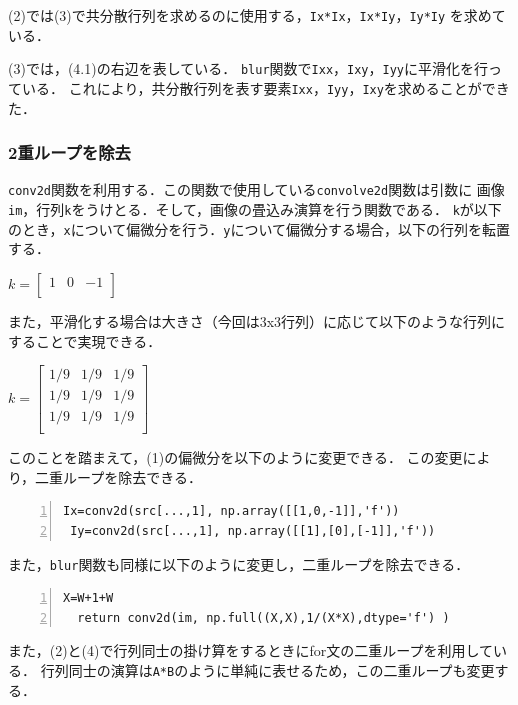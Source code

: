 \documentclass[autodetect-engine,dvi=dvipdfmx,ja=standard,
               a4j,11pt]{bxjsarticle}
\begin{document}
(2)では(3)で共分散行列を求めるのに使用する，\verb|Ix*Ix|，\verb|Ix*Iy|，\verb|Iy*Iy|
を求めている．

(3)では，(4.1)の右辺を表している．
\verb|blur|関数で\verb|Ixx|，\verb|Ixy|，\verb|Iyy|に平滑化を行っている．
これにより，共分散行列を表す要素\verb|Ixx|，\verb|Iyy|，\verb|Ixy|を求めることができた．

\subsubsection{2重ループを除去}

\verb|conv2d|関数を利用する．この関数で使用している\verb|convolve2d|関数は引数に
画像\verb|im|，行列\verb|k|をうけとる．そして，画像の畳込み演算を行う関数である．
\verb|k|が以下のとき，\verb|x|について偏微分を行う．\verb|y|について偏微分する場合，以下の行列を転置する．

$k=\begin{bmatrix}
1 & 0 & -1 \\
\end{bmatrix}$

また，平滑化する場合は大きさ（今回は3x3行列）に応じて以下のような行列にすることで実現できる．

$k=\begin{bmatrix}
1/9 & 1/9 & 1/9 \\
1/9 & 1/9 & 1/9 \\
1/9 & 1/9 & 1/9 \\
\end{bmatrix}$

このことを踏まえて，(1)の偏微分を以下のように変更できる．
この変更により，二重ループを除去できる．

\begin{Verbatim}[numbers=left, xleftmargin=10mm, numbersep=6pt,
                    fontsize=\small, baselinestretch=0.8]
 Ix=conv2d(src[...,1], np.array([[1,0,-1]],'f'))
 Iy=conv2d(src[...,1], np.array([[1],[0],[-1]],'f'))
\end{Verbatim}

また，\verb|blur|関数も同様に以下のように変更し，二重ループを除去できる．

\begin{Verbatim}[numbers=left, xleftmargin=10mm, numbersep=6pt,
                    fontsize=\small, baselinestretch=0.8]
 X=W+1+W
  return conv2d(im, np.full((X,X),1/(X*X),dtype='f') )
\end{Verbatim}

また，(2)と(4)で行列同士の掛け算をするときにfor文の二重ループを利用している．
行列同士の演算は\verb|A*B|のように単純に表せるため，この二重ループも変更する．
\end{document}
